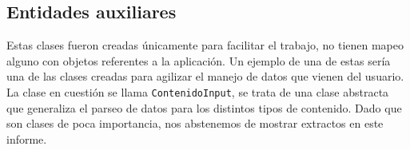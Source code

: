\subsection{Entidades auxiliares}\label{subsec:entidades-auxiliares}
Estas clases fueron creadas únicamente para facilitar el trabajo, no tienen mapeo alguno con objetos referentes a la
aplicación. 
Un ejemplo de una de estas sería una de las clases creadas para agilizar el manejo de datos que vienen del usuario.
La clase en cuestión se llama \lstinline|ContenidoInput|, se trata de una clase abstracta que generaliza el parseo de
datos para los distintos tipos de contenido.
Dado que son clases de poca importancia, nos abstenemos de mostrar extractos en este informe.
